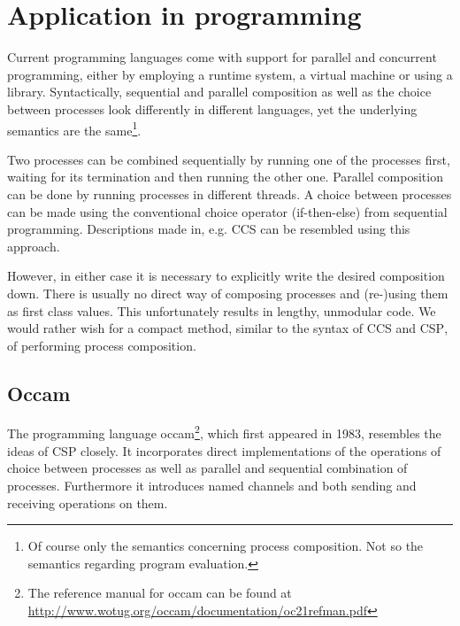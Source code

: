 
\section{Application in programming}
Current programming languages come with support for parallel and concurrent programming, either by employing a runtime system, a virtual machine or using a library. Syntactically, sequential and parallel composition as well as the choice between processes look differently in different languages, yet the underlying semantics are the same\footnote{Of course only the semantics concerning process composition. Not so the semantics regarding program evaluation.}. %

Two processes can be combined sequentially by running one of the processes first, waiting for its termination and then running the other one. Parallel composition can be done by running processes in different threads. A choice between processes can be made using the conventional choice operator (if-then-else) from sequential programming. Descriptions made in, e.g. \textsc{CCS} can be resembled using this approach.

However, in either case it is necessary to explicitly write the desired composition down. There is usually no direct way of composing processes and (re-)using them as first class values. This unfortunately results in lengthy, unmodular code. We would rather wish for a compact method, similar to the syntax of \textsc{CCS} and \textsc{CSP}, of performing process composition.

\subsection{Occam}
The programming language \textsf{occam}\footnote{The reference manual for \textsf{occam} can be found at \url{http://www.wotug.org/occam/documentation/oc21refman.pdf}}, which first appeared in 1983, resembles the ideas of CSP closely. It incorporates direct implementations of the operations of choice between processes as well as parallel and sequential combination of processes. Furthermore it introduces named channels and both sending and receiving operations on them.

